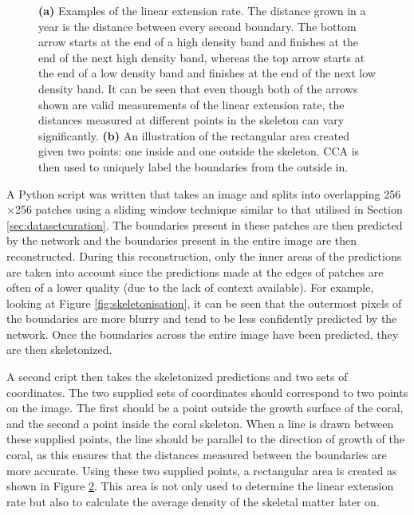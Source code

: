 \begin{figure}[t]
\begin{subfigure}[t]{0.49\textwidth}
        \caption{}
        \label{fig:calcificationrect}
    \end{subfigure}
    \caption{\textbf{(a)} Examples of the linear extension rate. The distance grown in a year is the distance between every second boundary. The bottom arrow starts at the end of a high density band and finishes at the end of the next high density band, whereas the top arrow starts at the end of a low density band and finishes at the end of the next low density band. It can be seen that even though both of the arrows shown are valid measurements of the linear extension rate, the distances measured at different points in the skeleton can vary significantly. \textbf{(b)} An illustration of the rectangular area created given two points: one inside and one outside the skeleton. CCA is then used to uniquely label the boundaries from the outside in.}
\end{figure}

A Python script was written that takes an image and splits into overlapping 256$\times$256 patches using a sliding window technique similar to that utilised in Section \ref{sec:datasetcuration}. The boundaries present in these patches are then predicted by the network and the boundaries present in the entire image are then reconstructed. During this reconstruction, only the inner areas of the predictions are taken into account since the predictions made at the edges of patches are often of a lower quality (due to the lack of context available). For example, looking at Figure \ref{fig:skeletonisation}, it can be seen that the outermost pixels of the boundaries are more blurry and tend to be less confidently predicted by the network. Once the boundaries across the entire image have been predicted, they are then skeletonized.

A second cript then takes the skeletonized predictions and two sets of coordinates. The two supplied sets of coordinates should correspond to two points on the image. The first should be a point outside the growth surface of the coral, and the second a point inside the coral skeleton. When a line is drawn between these supplied points, the line should be parallel to the direction of growth of the coral, as this ensures that the distances measured between the boundaries are more accurate. Using these two supplied points, a rectangular area is created as shown in Figure \ref{fig:calcificationrect}. This area is not only used to determine the linear extension rate but also to calculate the average density of the skeletal matter later on.

